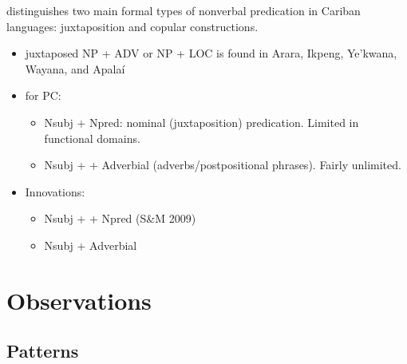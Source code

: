 \documentclass{memoir}
\begin{document}
\textcites[366]{gildea2018reconstructing} distinguishes two main formal
types of nonverbal predication in Cariban languages: juxtaposition and
copular constructions.

\begin{itemize}
\tightlist
\item
  juxtaposed NP + ADV or NP + LOC is found in Arara, Ikpeng, Ye'kwana,
  Wayana, and Apalaí
\item
  for PC:

  \begin{itemize}
  \tightlist
  \item
    Nsubj + Npred: nominal (juxtaposition) predication. Limited in
    functional domains.
  \item
    Nsubj +  + Adverbial (adverbs/postpositional phrases).
    Fairly unlimited.
  \end{itemize}
\item
  Innovations:

  \begin{itemize}
  \tightlist
  \item
    Nsubj +  + Npred (S\&M 2009)
  \item
    Nsubj + Adverbial
  \end{itemize}
\end{itemize}

\section{Observations}

\subsection{Patterns}
\end{document}

